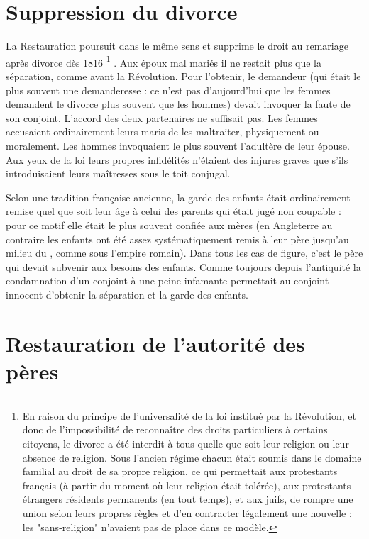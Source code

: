 \section{Suppression du divorce}

 La Restauration poursuit dans le même sens et supprime le droit au remariage après divorce dès 1816%
\footnote{En raison du principe de l'universalité de la loi institué par la Révolution, et donc de l'impossibilité de reconnaître des droits particuliers à certains citoyens, le divorce a été interdit à tous quelle que soit leur religion ou leur absence de religion. Sous l'ancien régime chacun était soumis dans le domaine familial au droit de sa propre religion, ce qui permettait aux protestants français (à partir du moment où leur religion était tolérée), aux protestants étrangers résidents permanents (en tout temps), et aux juifs, de rompre une union selon leurs propres règles et d'en contracter légalement une nouvelle : les "sans-religion" n'avaient pas de place dans ce modèle.}%
. Aux époux mal mariés il ne restait plus que la séparation, comme avant la Révolution. Pour l'obtenir, le demandeur (qui était le plus souvent une demanderesse : ce n'est pas d'aujourd'hui que les femmes demandent le divorce plus souvent que les hommes) devait invoquer la faute de son conjoint. L'accord des deux partenaires ne suffisait pas. Les femmes accusaient ordinairement leurs maris de les maltraiter, physiquement ou moralement. Les hommes invoquaient le plus souvent l'adultère de leur épouse. Aux yeux de la loi leurs propres infidélités n'étaient des injures graves que s'ils introduisaient leurs maîtresses sous le toit conjugal. 

 Selon une tradition française ancienne, la garde des enfants était ordinairement remise quel que soit leur âge à celui des parents qui était jugé non coupable : pour ce motif elle était le plus souvent confiée aux mères (en Angleterre au contraire les enfants ont été assez systématiquement remis à leur père jusqu'au milieu du , comme sous l'empire romain). Dans tous les cas de figure, c'est le père qui devait subvenir aux besoins des enfants. Comme toujours depuis l'antiquité la condamnation d'un conjoint à une peine infamante permettait au conjoint innocent d'obtenir la séparation et la garde des enfants.

\section{Restauration de l'autorité des pères}

